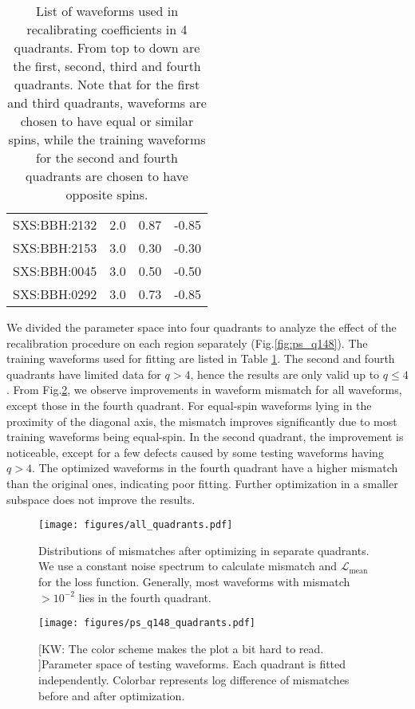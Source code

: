 \documentclass[twocolumn]{aastex631}
\newcommand{\kw}[1]{{\color{rb4}[KW: #1 ]}}
\begin{document}
\begin{table}[t]
\begin{tabularx}{0.8\columnwidth}{@{\extracolsep{\fill}}lrrr}
		SXS:BBH:2132 & 2.0 & 0.87     & -0.85    \\
		SXS:BBH:2153 & 3.0 & 0.30     & -0.30    \\
		SXS:BBH:0045 & 3.0 & 0.50     & -0.50    \\
		SXS:BBH:0292 & 3.0 & 0.73     & -0.85    \\ \midrule\bottomrule
	\end{tabularx}
	\caption{List of waveforms used in recalibrating coefficients in 4 quadrants. From top to down are the first, second, third and fourth quadrants. Note that for the first and third quadrants, waveforms are chosen to have equal or similar spins, while the training waveforms for the second and fourth quadrants are chosen to have opposite spins.}
	\label{tab:quadrants}
\end{table}

We divided the parameter space into four quadrants to analyze the effect of the
recalibration procedure on each region separately (Fig.\ref{fig:ps_q148}). The
training waveforms used for fitting are listed in Table \ref{tab:quadrants}. The
second and fourth quadrants have limited data for $q>4$, hence the results are
only valid up to $q\leq4$. From Fig.\ref{fig:ps_q148_quadrant}, we observe
improvements in waveform mismatch for all waveforms, except those in the fourth
quadrant. For equal-spin waveforms lying in the proximity of the diagonal axis,
the mismatch improves significantly due to most training waveforms being
equal-spin. In the second quadrant, the improvement is noticeable, except for a
few defects caused by some testing waveforms having $q>4$. The optimized
waveforms in the fourth quadrant have a higher mismatch than the original ones,
indicating poor fitting. Further optimization in a smaller subspace does not
improve the results.

\begin{figure}[t]
	\centering
	\texttt{[image: figures/all\_quadrants.pdf]}
	\caption{Distributions of mismatches after optimizing in separate quadrants.
	We use a constant noise spectrum to calculate mismatch and
	$\mathcal{L}_{\mathrm{mean}}$ for the loss function. Generally, most
	waveforms with mismatch $>10^{-2}$ lies in the fourth quadrant. }
	\label{fig:all_quadrants}
\end{figure}

\begin{figure}[t]
	\centering
	\texttt{[image: figures/ps\_q148\_quadrants.pdf]}
	\caption{\kw{The color scheme makes the plot a bit hard to read.}Parameter
	space of testing waveforms. Each quadrant is fitted independently. Colorbar
	represents log difference of mismatches before and after optimization.}
	\label{fig:ps_q148_quadrant}
\end{figure}
\end{document}
